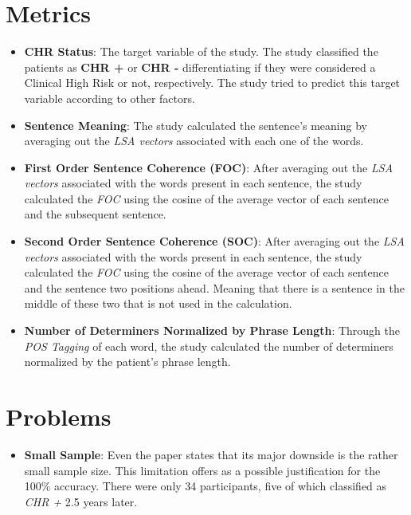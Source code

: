 \documentclass{Paper_Summary}
\begin{document}
\section{Metrics}
    \begin{itemize}
        \item \textbf{CHR Status}: The target variable of the study. The study classified the patients as \textbf{CHR +} or \textbf{CHR -} differentiating if they were considered a Clinical High Risk or not, respectively. The study tried to predict this target variable according to other factors.
        \item \textbf{Sentence Meaning}: The study calculated the sentence's meaning by averaging out the \emph{LSA vectors} associated with each one of the words.
        \item \textbf{First Order Sentence Coherence (FOC)}: After averaging out the \emph{LSA vectors} associated with the words present in each sentence, the study calculated the \emph{FOC} using the cosine of the average vector of each sentence and the subsequent sentence.
        \item \textbf{Second Order Sentence Coherence (SOC)}: After averaging out the \emph{LSA vectors} associated with the words present in each sentence, the study calculated the \emph{FOC} using the cosine of the average vector of each sentence and the sentence two positions ahead. Meaning that there is a sentence in the middle of these two that is not used in the calculation.
        \item \textbf{Number of Determiners Normalized by Phrase Length}: Through the \emph{POS Tagging} of each word, the study calculated the number of determiners normalized by the patient's phrase length.
    \end{itemize}

\section{Problems}
    \begin{itemize}
        \item \textbf{Small Sample}: Even the paper states that its major downside is the rather small sample size. This limitation offers as a possible justification for the 100\% accuracy. There were only 34 participants, five of which classified as \emph{CHR +} 2.5 years later. 
    \end{itemize}
\end{document}
